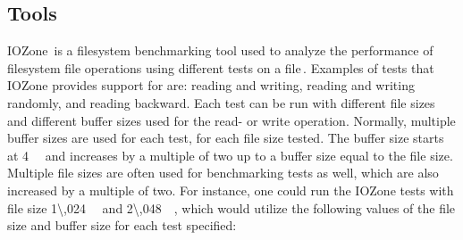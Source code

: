 \subsection{Tools}
IOZone\,\cite{IozoneFilesystemBenchmark} is a filesystem benchmarking tool used to analyze the performance of filesystem file operations using different tests on a file\,\cite{iozoneIozoneFilesystemBenchmark}. Examples of tests that IOZone provides support for are: reading and writing, reading and writing randomly, and reading backward. Each test can be run with different file sizes and different buffer sizes used for the read- or write operation. Normally, multiple buffer sizes are used for each test, for each file size tested. The buffer size starts at \SI{4}{\kilo\byte} and increases by a multiple of two up to a buffer size equal to the file size. Multiple file sizes are often used for benchmarking tests as well, which are also increased by a multiple of two. For instance, one could run the IOZone tests with file size \SI{1\,024}{\kilo\byte} and \SI{2\,048}{\kilo\byte}, which would utilize the following values of the file size and buffer size for each test specified:
